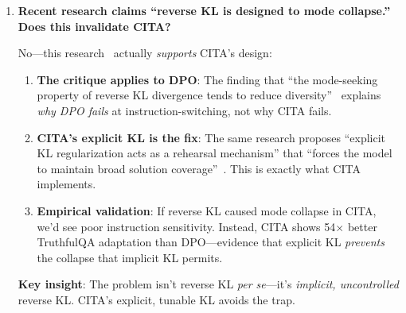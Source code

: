 \begin{enumerate}[label=\textbf{Q\arabic*.}, leftmargin=*, itemsep=8pt]
\textbf{CITA's solution}: By separating $\lambda_{\text{KL}}$ from $\beta$, CITA can:
\begin{enumerate}[leftmargin=*,itemsep=1pt]
    \item Set $\beta$ high for sharp preference learning
    \item Set $\lambda_{\text{KL}}$ to maintain behavioral diversity
    \item Find the sweet spot that achieves \textit{both} goals
\end{enumerate}

This decoupling is why CITA achieves 86.7\% instruction-alignment efficiency while DPO achieves only 56.1\%---a 30.6 percentage point (pp) gap explained entirely by KL architecture.

\vspace{4mm}

\item \textbf{Recent research claims ``reverse KL is designed to mode collapse.'' Does this invalidate CITA?}

 No---this research~\cite{liu2024kl,goyal2024beyond} actually \textit{supports} CITA's design:

\begin{enumerate}[leftmargin=*,itemsep=2pt]
    \item \textbf{The critique applies to DPO}: The finding that ``the mode-seeking property of reverse KL divergence tends to reduce diversity''~\cite{goyal2024beyond} explains \textit{why DPO fails} at instruction-switching, not why CITA fails.

    \item \textbf{CITA's explicit KL is the fix}: The same research proposes ``explicit KL regularization acts as a rehearsal mechanism'' that ``forces the model to maintain broad solution coverage''~\cite{wang2024comprehensive}. This is exactly what CITA implements.

    \item \textbf{Empirical validation}: If reverse KL caused mode collapse in CITA, we'd see poor instruction sensitivity. Instead, CITA shows 54$\times$ better TruthfulQA adaptation than DPO---evidence that explicit KL \textit{prevents} the collapse that implicit KL permits.
\end{enumerate}

\textbf{Key insight}: The problem isn't reverse KL \textit{per se}---it's \textit{implicit, uncontrolled} reverse KL. CITA's explicit, tunable KL avoids the trap.



\end{enumerate}
